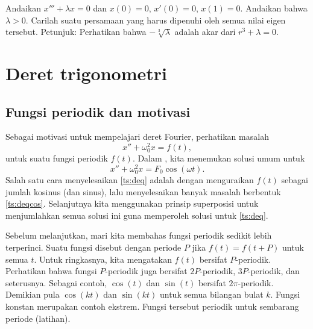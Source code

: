 \begin{exercise}[menantang]
Andaikan $x''' + \lambda x = 0$ dan $x(0)=0$, $x'(0) = 0$, $x(1) = 0$.
Andaikan bahwa $\lambda > 0$.  Carilah suatu persamaan yang harus dipenuhi oleh semua
nilai eigen tersebut.
Petunjuk: Perhatikan bahwa $-\sqrt[3]{\lambda}$ adalah akar
dari $r^3+\lambda = 0$.
\end{exercise}


\sectionnewpage
\section{Deret trigonometri} \label{ts:section}



\subsection{Fungsi periodik dan motivasi}

Sebagai motivasi untuk mempelajari deret Fourier, perhatikan masalah
\begin{equation} \label{ts:deq}
x'' + \omega_0^2 x = f(t) ,
\end{equation}
untuk suatu fungsi periodik $f(t)$.
Dalam , kita menemukan solusi umum untuk
\begin{equation} \label{ts:deqcos}
x'' + \omega_0^2 x = F_0 \cos ( \omega t) .
\end{equation}
Salah satu cara menyelesaikan \eqref{ts:deq} adalah dengan
menguraikan $f(t)$ sebagai jumlah kosinus (dan sinus), lalu
menyelesaikan banyak masalah berbentuk \eqref{ts:deqcos}.  Selanjutnya kita menggunakan
prinsip superposisi untuk menjumlahkan semua solusi ini
guna memperoleh solusi untuk \eqref{ts:deq}.

Sebelum melanjutkan, mari kita membahas fungsi periodik
sedikit lebih terperinci.
Suatu fungsi disebut \emph{} dengan periode $P$ jika
$f(t) = f(t+P)$ untuk semua $t$.  Untuk ringkasnya, kita mengatakan $f(t)$ bersifat $P$-periodik.
Perhatikan bahwa fungsi $P$-periodik juga bersifat $2P$-periodik, $3P$-periodik,
dan seterusnya.
Sebagai contoh, $\cos (t)$ dan $\sin (t)$ bersifat
$2\pi$-periodik.  Demikian pula $\cos (kt)$ dan $\sin (kt)$ untuk semua bilangan bulat $k$.  Fungsi
konstan merupakan contoh ekstrem.  Fungsi tersebut periodik untuk sembarang periode
(latihan).

